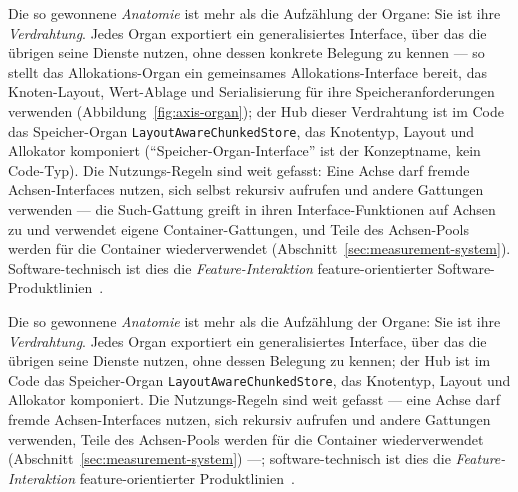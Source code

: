 \begin{nurlang}
Die so gewonnene \emph{Anatomie} ist mehr als die Aufzählung der Organe: Sie ist ihre \emph{Verdrahtung}.
Jedes Organ exportiert ein generalisiertes Interface, über das die übrigen seine Dienste nutzen, ohne
dessen konkrete Belegung zu kennen --- so stellt das Allokations-Organ ein gemeinsames
Allokations-Interface bereit, das Knoten-Layout, Wert-Ablage und Serialisierung für ihre
Speicheranforderungen verwenden (Abbildung~\ref{fig:axis-organ}); der Hub dieser Verdrahtung ist im Code
das Speicher-Organ \texttt{LayoutAwareChunkedStore}, das Knotentyp, Layout und Allokator komponiert
(\enquote{Speicher-Organ-Interface} ist der Konzeptname, kein Code-Typ). Die Nutzungs-Regeln sind weit
gefasst: Eine Achse darf fremde Achsen-Interfaces nutzen, sich selbst rekursiv aufrufen und andere
Gattungen verwenden --- die Such-Gattung greift in ihren Interface-Funktionen auf Achsen zu und verwendet
eigene Container-Gattungen, und Teile des Achsen-Pools werden für die Container wiederverwendet
(Abschnitt~\ref{sec:measurement-system}). Software-technisch ist dies die \emph{Feature-Interaktion}
feature-orientierter Software-Produktlinien~\cite{apel2013feature,batory1992hierarchical}.
\end{nurlang}
\begin{nurkurz}
Die so gewonnene \emph{Anatomie} ist mehr als die Aufzählung der Organe: Sie ist ihre \emph{Verdrahtung}. Jedes
Organ exportiert ein generalisiertes Interface, über das die übrigen seine Dienste nutzen, ohne dessen Belegung
zu kennen; der Hub ist im Code das Speicher-Organ \texttt{LayoutAwareChunkedStore}, das Knotentyp, Layout und
Allokator komponiert. Die Nutzungs-Regeln sind weit gefasst --- eine Achse darf fremde Achsen-Interfaces nutzen,
sich rekursiv aufrufen und andere Gattungen verwenden, Teile des Achsen-Pools werden für die Container
wiederverwendet (Abschnitt~\ref{sec:measurement-system}) ---; software-technisch ist dies die
\emph{Feature-Interaktion} feature-orientierter Produktlinien~\cite{apel2013feature,batory1992hierarchical}.
\end{nurkurz}

